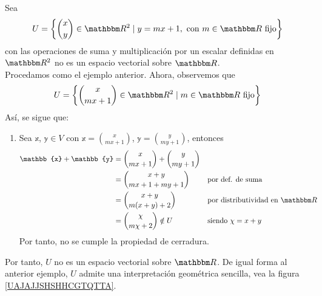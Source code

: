 \begin{example}
    Sea
    $$\displaystyle U = \left\{ \binom{x}{y} \in \RR[2] \mid y = mx+1, \text{ con }  m \in \RR \text{ fijo} \right\}$$
    con las operaciones de suma y multiplicación por un escalar definidas en $\RR[2]$ no es un espacio vectorial sobre $\RR$. \\
    \solucion Procedamos como el ejemplo anterior. Ahora, observemos que
    $$U = \left\{ \binom{x}{mx+1} \in \RR[2] \mid  m \in \RR \text{ fijo} \right\}$$
    Así, se sigue que:
    \begin{enumerate}[label=\roman*)]
        \item Sea $\mathbb{x}$, $\mathbb{y} \in V$ con $\displaystyle \mathbb{x} = \binom{x}{mx+1}$, $\displaystyle \mathbb{y} = \binom{y}{my+1}$, entonces
        \begin{align*}
            \mathbb{x} + \mathbb{y} & = \binom{x}{mx+1} + \binom{y}{my+1} \\
            & = \binom{x+y}{mx+1+my+1} && \text{por def. de suma} \\
            & = \binom{x+y}{m(x+y)+2} && \text{por distributividad en $\RR$} \\
            & = \binom{\chi}{m\chi + 2} \notin U && \text{siendo $\chi = x + y$}
        \end{align*}
        Por tanto, no se cumple la propiedad de cerradura.
    \end{enumerate}
    Por tanto, $U$ no es un espacio vectorial sobre $\RR$. De igual forma al anterior ejemplo, $U$ admite una interpretación geométrica sencilla, vea la figura \ref{UAJAJJSHSHHCGTQTTA}.
\end{example}

\newpage

